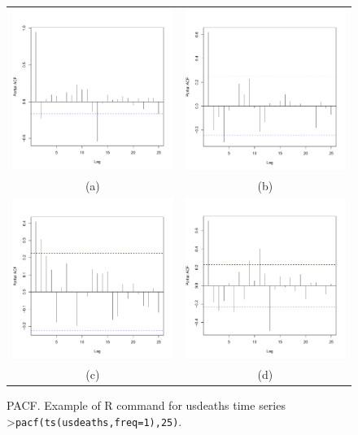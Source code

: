 \documentclass[a4paper,11pt,oneside,onecolumn]{book}
\begin{document}
\begin{figure}[!h]
\begin{tabular}{cc}
\includegraphics[width=.5\linewidth]{ airpassPACF}&\includegraphics[width=.5\linewidth]{ minkPACF}\\
(a) &(b)\\
\includegraphics[width=.5\linewidth]{ cowtempPACF}&\includegraphics[width=.5\linewidth]{ usdeathsPACF}\\
(c) & (d)\\
\end{tabular}
\caption{PACF. Example of R command for usdeaths time series >\texttt{pacf(ts(usdeaths,freq=1),25)}.} \label{fig:ex:pacf}
\end{figure}
\end{document}
